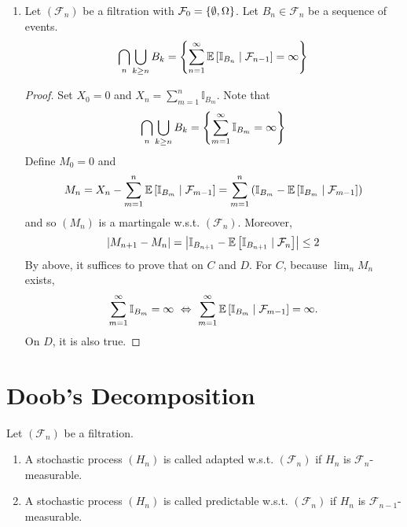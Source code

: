 \begin{exam}
\begin{enumerate}[label=(\arabic{*})]
        \item Let $(\mathcal{F}_n)$ be a filtration with $\mathcal{F}_0 = \left\{\emptyset,\Omega\right\}$. Let $B_n \in \mathcal{F}_n$ be a sequence of events.
        \begin{equation*}
            \bigcap_n \bigcup_{k \geq n} B_k = \left\{ \sum_{n=1}^\infty \mathbb{E}\left[ \mathbb{I}_{B_n} \mid \mathcal{F}_{n-1}\right] = \infty\right\}
        \end{equation*}
        \begin{proof}
            Set $X_0 = 0$ and $X_n = \sum_{m = 1}^n \mathbb{I}_{B_m}$. Note that
            \begin{equation*}
                \bigcap_n \bigcup_{k \geq n} B_k = \left\{\sum_{m=1}^\infty \mathbb{I}_{B_m} = \infty\right\}
            \end{equation*}
            Define $M_0 = 0$ and
            \begin{equation*}
                M_n = X_n - \sum_{m=1}^n \mathbb{E}\left[\mathbb{I}_{B_m} \mid \mathcal{F}_{m - 1}\right] = \sum_{m=1}^n \left(\mathbb{I}_{B_m} - \mathbb{E}\left[\mathbb{I}_{B_m} \mid \mathcal{F}_{m - 1}\right]\right)
            \end{equation*}
            and so $(M_n)$ is a martingale w.s.t. $(\mathcal{F}_n)$. Moreover,
            \begin{equation*}
                \left\lvert M_{n+1} - M_n\right\lvert = \left\lvert\mathbb{I}_{B_{n+1}} - \mathbb{E}\left[\mathbb{I}_{B_{n+1}} \mid \mathcal{F}_{n}\right]\right\lvert \leq 2
            \end{equation*}
            By above, it suffices to prove that on $C$ and $D$. For $C$, because $\lim_n M_n$ exists,
            \begin{equation*}
                \sum_{m=1}^\infty \mathbb{I}_{B_m} = \infty ~\Leftrightarrow~ \sum_{m=1}^\infty \mathbb{E}\left[\mathbb{I}_{B_m} \mid \mathcal{F}_{m - 1}\right] = \infty.
            \end{equation*}
            On $D$, it is also true. \qedhere
        \end{proof}
    \end{enumerate}
\end{exam}

\section{Doob's Decomposition}

\begin{defn}
    Let $(\mathcal{F}_n)$ be a filtration.
    \begin{enumerate}[label=(\arabic{*})]
        \item A stochastic process $(H_n)$ is called adapted w.s.t. $(\mathcal{F}_n)$ if $H_n$ is $\mathcal{F}_{n}$-measurable.
        \item A stochastic process $(H_n)$ is called predictable w.s.t. $(\mathcal{F}_n)$ if $H_n$ is $\mathcal{F}_{n-1}$-measurable.
    \end{enumerate}
\end{defn}

